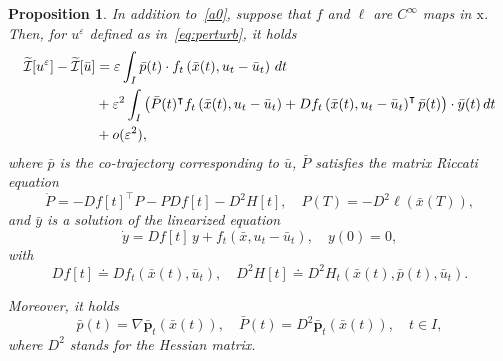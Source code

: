 \documentclass[sn-mathphys-num]{sn-jnl}
\numberwithin{equation}{section}
\theoremstyle{mythm}
\newtheorem{proposition}{Proposition}[section]
\theoremstyle{mydef}
\newcommand{\T}{\intercal}
\begin{document}
\begin{proposition}\label{propo2ord}
  In addition to~\ref{a0}, suppose that \( f \) and \( \ell \) are \( C^\infty \) maps in \( \mathrm x \). %
  Then, for \( u^{\varepsilon} \) defined as in~\eqref{eq:perturb}, it holds
  \begin{align}
    \widetilde{\mathcal I}[u^{\varepsilon}] - \widetilde{\mathcal I}[\bar{u}]
    &= \varepsilon\int_I \bar{p}(t)\cdot f_t \left(\bar{x}(t), u_t - \bar{u}_t \right)\, dt \notag\\
    &+\varepsilon^2\int_I \left( \bar{P}(t)^{\T} f_t\left(\bar{x}(t),u_t - \bar{u}_t \right) + Df_t\left(\bar{x}(t),u_t - \bar{u}_t \right)^{\T}\bar{p}(t)  \right)\cdot \bar{y}(t)\, dt\notag \\
    &+ o(\varepsilon^2),
    \label{eq:2order}
  \end{align}
where \( \bar{p} \) is the co-trajectory corresponding to \( \bar{u} \), \( \bar{P} \) satisfies the matrix Riccati equation
\begin{equation}
  \label{eq:riccati}
\dot P = - Df[t]^{\T} P - P Df[t] - D^2H[t], \quad P(T)=-D^2\ell(\bar{x}(T)),
\end{equation}
and \( \bar{y} \) is a solution of the linearized equation
\begin{equation}
  \label{eq:lin}
\dot y = Df[t] \, y + f_t(\bar{x},u_{t}-\bar{u}_{t}),\quad y(0) = 0,
\end{equation}
with
\[
  Df[t] \doteq Df_t(\bar{x}(t), \bar{u}_t), \quad
D^2H[t] \doteq D^2H_t(\bar{x}(t),\bar{p}(t),\bar{u}_t).
\]

Moreover, it holds
\[
  \bar{p}(t) = \nabla \bar{\bm p}_t(\bar{x}(t)),\quad
  \bar{P}(t) = D^2 \bar{\bm p}_t(\bar{x}(t)), \quad t \in I,
\]
where $D^2$ stands for the Hessian matrix.
\end{proposition}
\end{document}

